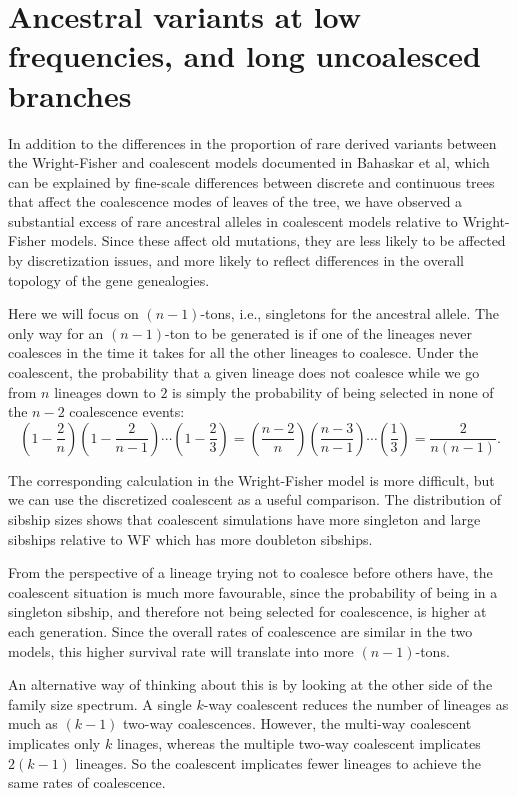 \documentclass[review,nonatbib]{elsarticle}
\begin{document}
\section{Ancestral variants at low frequencies, and long uncoalesced branches}

In addition to the differences in the proportion of rare derived variants between the Wright-Fisher and coalescent models documented in Bahaskar et al, which can be 
explained by fine-scale differences between discrete and continuous trees that affect the coalescence modes of leaves of the tree, 
we have observed a substantial excess of rare ancestral alleles in coalescent models relative to Wright-Fisher models. 
Since these affect old mutations, they are less likely to be affected by discretization issues, and more likely to reflect differences in the overall topology of the gene genealogies. 


Here we will focus on $(n-1)$-tons, i.e., singletons for the ancestral allele. The only way for an $(n-1)$-ton to be generated is if one of the lineages never coalesces in the time
 it takes for all the other lineages to coalesce. Under the coalescent, the probability that a given lineage does not coalesce while we go from $n$ lineages down to $2$ is simply
 the probability of being selected in none of the $n-2$ coalescence events:
 $$\left(1-\frac{2}{n}\right) \left(1-\frac{2}{n-1}\right) \cdots \left(1-\frac{2}{3}\right) = \left(\frac{n-2}{n}\right) \left(\frac{n-3}{n-1}\right) \cdots  \left(\frac{1}{3}\right) = \frac{2}{n (n-1)}.$$
 
 The corresponding calculation in the Wright-Fisher model is more difficult, but we can use the discretized coalescent as a useful comparison. 
The distribution of sibship sizes shows that coalescent simulations have more singleton and large sibships relative to WF which has more 
doubleton sibships.

From the perspective of a lineage trying not to coalesce before others have, the coalescent situation is much more favourable, since the probability 
of being in a singleton sibship, and therefore not being selected for coalescence, is higher at each generation. Since the overall rates of coalescence 
are similar in the two models, this higher survival rate will translate into more $(n-1)$-tons. 

An alternative way of thinking about this is by looking at the other side of the family size spectrum. A single $k$-way coalescent 
reduces the number of lineages as much as $(k-1)$ two-way coalescences. However, the multi-way coalescent implicates only $k$ 
linages, whereas the multiple two-way coalescent implicates $2(k-1)$ lineages. So the coalescent implicates fewer lineages to achieve 
the same rates of coalescence. 
\end{document}

